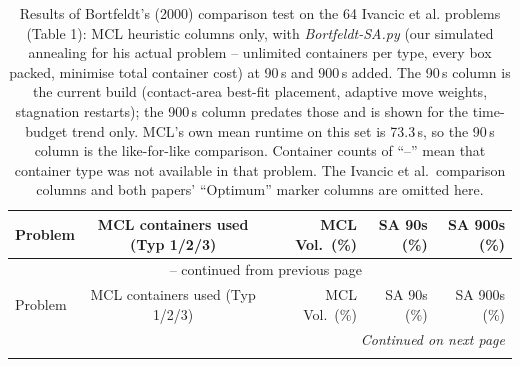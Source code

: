 \begin{longtable}{lrrrrrr}
  \caption{Results of Bortfeldt's (2000) comparison test on the 64
    Ivancic et al. problems (Table 1): MCL heuristic columns only, with
    \emph{Bortfeldt-SA.py} (our simulated annealing for his actual
    problem -- unlimited containers per type, every box packed,
    minimise total container cost) at 90\,s and 900\,s added. The 90\,s
    column is the current build (contact-area best-fit placement,
    adaptive move weights, stagnation restarts); the 900\,s column
    predates those and is shown for the time-budget trend only. MCL's own
    mean runtime on this set is 73.3\,s, so the 90\,s column is the
    like-for-like comparison. Container counts
    of ``--'' mean that container type was not available in that
    problem. The Ivancic et al.\ comparison columns and both papers'
    ``Optimum'' marker columns are omitted here.}
  \label{tab:bortfeldt-mcl} \\
  \toprule
  Problem & \multicolumn{3}{c}{MCL containers used (Typ 1/2/3)} & MCL Vol.\ (\%) & SA 90s (\%) & SA 900s (\%) \\
  \midrule
  \endfirsthead

  \multicolumn{7}{c}{{\tablename\ \thetable{} -- continued from previous page}} \\
  \toprule
  Problem & \multicolumn{3}{c}{MCL containers used (Typ 1/2/3)} & MCL Vol.\ (\%) & SA 90s (\%) & SA 900s (\%) \\
  \midrule
  \endhead

  \midrule
  \multicolumn{7}{r}{\emph{Continued on next page}} \\
  \endfoot

  \bottomrule
  \endlastfoot


\end{longtable}
